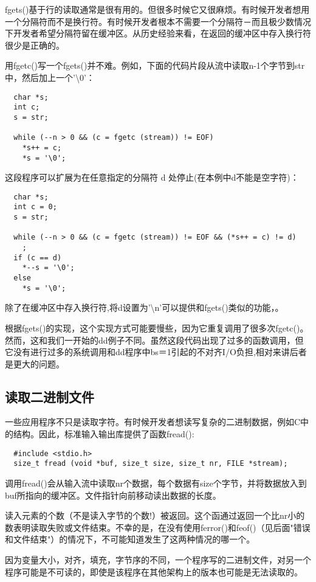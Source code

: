 fgets()基于行的读取通常是很有用的。但很多时候它又很麻烦。有时候开发者想用一个分隔符而不是换行符。有时候开发者根本不需要一个分隔符－而且极少数情况下开发者希望分隔符留在缓冲区。从历史经验来看，在返回的缓冲区中存入换行符很少是正确的。

用fgetc()写一个fgets()并不难。例如，下面的代码片段从流中读取n-1个字节到str中，然后加上一个'\textbackslash0'：
\begin{lstlisting}
  char *s; 
  int c;
  s = str;
  
  while (--n > 0 && (c = fgetc (stream)) != EOF)
    *s++ = c;
    *s = '\0';
\end{lstlisting}

这段程序可以扩展为在任意指定的分隔符 d 处停止(在本例中d不能是空字符)：
\begin{lstlisting}
  char *s;
  int c = 0;
  s = str;
  
  while (--n > 0 && (c = fgetc (stream)) != EOF && (*s++ = c) != d)
    ;
  if (c == d)
    *--s = '\0';
  else
    *s = '\0';
\end{lstlisting}

除了在缓冲区中存入换行符,将d设置为'{\textbackslash}n'可以提供和fgets()类似的功能，。

根据fgets()的实现，这个实现方式可能要慢些，因为它重复调用了很多次fgetc()。 然而，这和我们一开始的dd例子不同。虽然这段代码出现了过多的函数调用，但它没有进行过多的系统调用和dd程序中bs＝1引起的不对齐I/O负担,相对来讲后者是更大的问题。

\subsection{读取二进制文件}

一些应用程序不只是读取字符。有时候开发者想读写复杂的二进制数据，例如C中的结构。因此，标准输入输出库提供了函数fread():
\begin{lstlisting}
  #include <stdio.h>
  size_t fread (void *buf, size_t size, size_t nr, FILE *stream);
\end{lstlisting}

调用fread()会从输入流中读取nr个数据，每个数据有size个字节，并将数据放入到buf所指向的缓冲区。文件指针向前移动读出数据的长度。

读入元素的个数（不是读入字节的个数!）被返回。这个函通过返回一个比nr小的数表明读取失败或文件结束。不幸的是，在没有使用ferror()和feof()（见后面"错误和文件结束"）的情况下，不可能知道发生了这两种情况的哪一个。

因为变量大小，对齐，填充，字节序的不同，一个程序写的二进制文件，对另一个程序可能是不可读的，即使是该程序在其他架构上的版本也可能是无法读取的。

